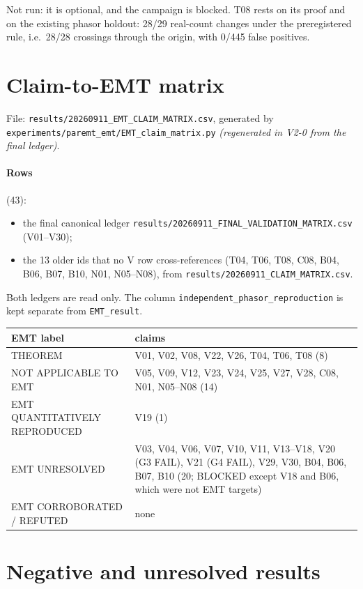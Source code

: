 \documentclass[10pt,a4paper]{article}
\newcommand{\f}[1]{\nolinkurl{#1}}
\begin{document}
Not run: it is optional, and the campaign is blocked. T08 rests on its proof
and on the existing phasor holdout: 28/29 real-count changes under the
preregistered rule, i.e.\ 28/28 crossings through the origin, with 0/445 false
positives.

\section{Claim-to-EMT matrix}

File: \f{results/20260911_EMT_CLAIM_MATRIX.csv}, generated by
\f{experiments/paremt_emt/EMT_claim_matrix.py} \emph{(regenerated in V2-0 from
the final ledger)}.

\paragraph{Rows} (43):
\begin{itemize}
\item the final canonical ledger \f{results/20260911_FINAL_VALIDATION_MATRIX.csv}
  (V01--V30);
\item the 13 older ids that no V row cross-references (T04, T06, T08, C08, B04,
  B06, B07, B10, N01, N05--N08), from \f{results/20260911_CLAIM_MATRIX.csv}.
\end{itemize}
Both ledgers are read only. The column \texttt{independent\_phasor\_reproduction}
is kept separate from \texttt{EMT\_result}.

\medskip
\noindent\begin{tabularx}{\linewidth}{@{}L{5.0cm}Y@{}}
\toprule
EMT label & claims\\
\midrule
THEOREM & V01, V02, V08, V22, V26, T04, T06, T08 (8)\\
NOT APPLICABLE TO EMT & V05, V09, V12, V23, V24, V25, V27, V28, C08, N01, N05--N08 (14)\\
EMT QUANTITATIVELY REPRODUCED & V19 (1)\\
EMT UNRESOLVED & V03, V04, V06, V07, V10, V11, V13--V18, V20 (G3 FAIL), V21 (G4 FAIL), V29, V30, B04, B06, B07, B10 (20; BLOCKED except V18 and B06, which were not EMT targets)\\
EMT CORROBORATED / REFUTED & none\\
\bottomrule
\end{tabularx}

\section{Negative and unresolved results}
\end{document}
